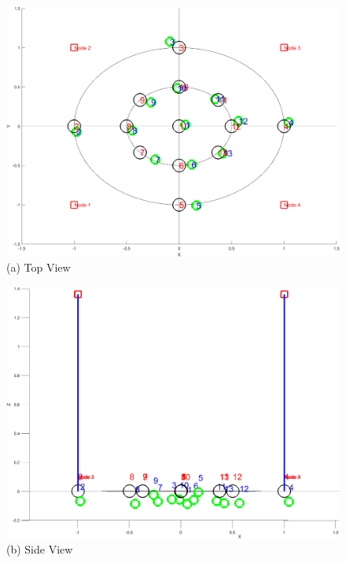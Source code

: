 \begin{figure} [H]
	\centering
    \begin{minipage}{.5\textwidth}
      \centering
      \includegraphics[width=0.9\linewidth]{../Images/Experiments-Results/nodes-pos-with-est-up.png}\\
      {(a) Top View}
    \end{minipage}%
    \begin{minipage}{.5\textwidth}
      \centering
      \includegraphics[width=.9\linewidth]{../Images/Experiments-Results/nodes-pos-with-est-side.png}\\
      {(b) Side View}
	  \end{minipage}
  \begin{minipage}{\textwidth}
    \centering

\end{minipage}
\end{figure}
